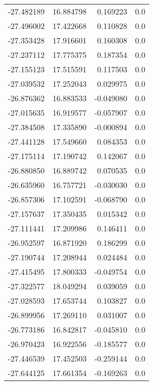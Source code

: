 \begin{tabular}{rrrr}
      -27.482189 &        16.884798 &    0.169223 &   0.0 \\
      -27.496002 &        17.422668 &    0.110828 &   0.0 \\
      -27.353428 &        17.916601 &    0.160308 &   0.0 \\
      -27.237112 &        17.775375 &    0.187354 &   0.0 \\
      -27.155123 &        17.515591 &    0.117503 &   0.0 \\
      -27.039532 &        17.252043 &    0.029975 &   0.0 \\
      -26.876362 &        16.883533 &   -0.049080 &   0.0 \\
      -27.015635 &        16.919577 &   -0.057907 &   0.0 \\
      -27.384508 &        17.335890 &   -0.000894 &   0.0 \\
      -27.441128 &        17.549660 &    0.084353 &   0.0 \\
      -27.175114 &        17.190742 &    0.142067 &   0.0 \\
      -26.880850 &        16.889742 &    0.070535 &   0.0 \\
      -26.635960 &        16.757721 &   -0.030030 &   0.0 \\
      -26.857306 &        17.102591 &   -0.068790 &   0.0 \\
      -27.157637 &        17.350435 &    0.015342 &   0.0 \\
      -27.111441 &        17.209986 &    0.146411 &   0.0 \\
      -26.952597 &        16.871920 &    0.186299 &   0.0 \\
      -27.190744 &        17.208944 &    0.024484 &   0.0 \\
      -27.415495 &        17.800333 &   -0.049754 &   0.0 \\
      -27.322577 &        18.049294 &    0.039059 &   0.0 \\
      -27.028593 &        17.653744 &    0.103827 &   0.0 \\
      -26.899956 &        17.269110 &    0.031007 &   0.0 \\
      -26.773186 &        16.842817 &   -0.045810 &   0.0 \\
      -26.970423 &        16.922556 &   -0.185577 &   0.0 \\
      -27.446539 &        17.452503 &   -0.259144 &   0.0 \\
      -27.644125 &        17.661354 &   -0.169263 &   0.0 \\

\end{tabular}
